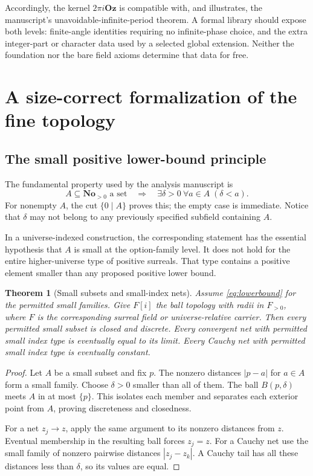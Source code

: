 \documentclass[11pt,letterpaper]{article}
\numberwithin{equation}{section}
\newtheorem{theorem}{Theorem}[section]
\theoremstyle{definition}
\theoremstyle{remark}
\newcommand{\No}{\mathbf{No}}
\newcommand{\Oz}{\mathbf{Oz}}
\begin{document}
Accordingly, the kernel $2\pi i\Oz$ is compatible with, and illustrates, the manuscript's unavoidable-infinite-period theorem. A formal library should expose both levels: finite-angle identities requiring no infinite-phase choice, and the extra integer-part or character data used by a selected global extension. Neither the foundation nor the bare field axioms determine that data for free.

\section{A size-correct formalization of the fine topology}\label{sec:topology}
\subsection{The small positive lower-bound principle}
The fundamental property used by the analysis manuscript is
\begin{equation}\label{eq:lowerbound}
 A\subseteq\No_{>0}\text{ a set}\quad\Longrightarrow\quad
 \exists\delta>0\ \forall a\in A\;(\delta<a).
\end{equation}
For nonempty $A$, the cut $\{0\mid A\}$ proves this; the empty case is immediate. Notice that $\delta$ may not belong to any previously specified subfield containing $A$.

In a universe-indexed construction, the corresponding statement has the essential hypothesis that $A$ is small at the option-family level. It does not hold for the entire higher-universe type of positive surreals. That type contains a positive element smaller than any proposed positive lower bound.

\begin{theorem}[Small subsets and small-index nets]\label{thm:smalltopology}
Assume \eqref{eq:lowerbound} for the permitted small families. Give $F[i]$ the ball topology with radii in $F_{>0}$, where $F$ is the corresponding surreal field or universe-relative carrier. Then every permitted small subset is closed and discrete. Every convergent net with permitted small index type is eventually equal to its limit. Every Cauchy net with permitted small index type is eventually constant.
\end{theorem}
\begin{proof}
Let $A$ be a small subset and fix $p$. The nonzero distances $|p-a|$ for $a\in A$ form a small family. Choose $\delta>0$ smaller than all of them. The ball $B(p,\delta)$ meets $A$ in at most $\{p\}$. This isolates each member and separates each exterior point from $A$, proving discreteness and closedness.

For a net $z_j\to z$, apply the same argument to its nonzero distances from $z$. Eventual membership in the resulting ball forces $z_j=z$. For a Cauchy net use the small family of nonzero pairwise distances $|z_j-z_k|$. A Cauchy tail has all these distances less than $\delta$, so its values are equal.
\end{proof}
\end{document}
